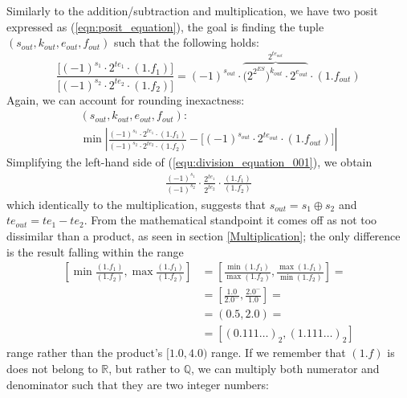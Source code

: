 Similarly to the addition/subtraction and multiplication, we have two posit expressed as (\eqref{eqn:posit_equation}), the goal is finding the tuple $(s_{out}, k_{out}, e_{out}, f_{out})$ such that
the following holds:
\begin{equation}\label{equ:division_equation_001}
    \frac{\big[ (-1)^{s_1} \cdot 2^{te_1} \cdot (1.f_1) \big]}{\big[ (-1)^{s_2} \cdot 2^{te_2} \cdot (1.f_2) \big]} = (-1)^{s_{out}} \cdot \overbrace{\big(2^{2^{ES}}\big)^{k_{out}} \cdot 2^{e_{out}}}^{2^{te_{out}}} \cdot (1.f_{out})
\end{equation}
Again, we can account for rounding inexactness:
\begin{equation}
\begin{gathered}
    (s_{out}, k_{out}, e_{out}, f_{out}): \\
    \min \left| \frac{ (-1)^{s_1} \cdot 2^{te_1} \cdot (1.f_1)}{(-1)^{s_2} \cdot 2^{te_2} \cdot (1.f_2)} - \big[ (-1)^{s_{out}} \cdot 2^{te_{out}} \cdot (1.f_{out}) \big] \right|
\end{gathered}
\end{equation}
Simplifying the left-hand side of (\ref{equ:division_equation_001}), we obtain
\begin{equation}
\begin{gathered}
    \frac{(-1)^{s_1}}{(-1)^{s_2}} \cdot \frac{2^{te_1}}{2^{te_2}} \cdot \frac{(1.f_1)}{(1.f_2)}
\end{gathered}
\end{equation}
which identically to the multiplication, suggests that $s_{out} = s_1 \oplus s_2$ and $te_{out} = te_1 - te_2$.
From the mathematical standpoint it comes off as not too dissimilar than a product, as seen in section \ref{Multiplication}; the only difference is the result falling within the range
\begin{equation}\label{equ:min_max_frac_0010032}
\begin{aligned}
\left[\min{\frac{(1.f_1)}{(1.f_2)}}, \max{\frac{(1.f_1)}{(1.f_2)}} \right] &= \left[\frac{\min{(1.f_1)}}{\max{(1.f_2)}}, \frac{\max{(1.f_1)}}{\min{(1.f_2)}} \right] = \\
&= \left[\frac{1.0}{2.0^{-}}, \frac{2.0^{-}}{1.0} \right] =\\
&= \left(0.5, 2.0 \right) = \\
&= \left[(0.111\dots)_2, (1.111\dots)_2 \right]
\end{aligned}
\end{equation}
range rather than the product's $[1.0, 4.0)$ range.
If we remember that $(1.f)$ is does not belong to $\mathbb{R}$, but rather to $ \mathbb{Q}$, we can multiply both numerator and denominator such that they are two integer numbers:
